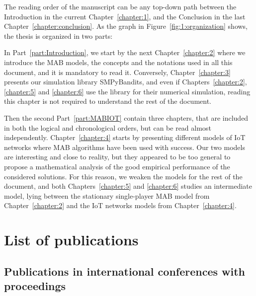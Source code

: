 The reading order of the manuscript can be any top-down path between the Introduction in the current Chapter~\ref{chapter:1}, and the Conclusion in the last Chapter~\ref{chapter:conclusion}. As the graph in Figure~\ref{fig:1:organization} shows,
the thesis is organized in two parts:

In Part~\ref{part:Introduction}, we start by the next Chapter~\ref{chapter:2} where we introduce the MAB models, the concepts and the notations used in all this document, and it is mandatory to read it.
Conversely, Chapter~\ref{chapter:3} presents our simulation library SMPyBandits, and even if Chapters~\ref{chapter:2}, \ref{chapter:5} and \ref{chapter:6} use the library for their numerical simulation, reading this chapter is not required to understand the rest of the document.

Then the second Part~\ref{part:MABIOT} contain three chapters, that are included in both the logical and chronological orders, but can be read almost independently.
Chapter~\ref{chapter:4} starts by presenting different models of IoT networks where MAB algorithms have been used with success. Our two models are interesting and close to reality, but they appeared to be too general to propose a mathematical analysis of the good empirical performance of the considered solutions.
For this reason, we weaken the models for the rest of the document,
and both Chapters~\ref{chapter:5} and \ref{chapter:6} studies an intermediate model, lying between the stationary single-player MAB model from Chapter~\ref{chapter:2} and the IoT networks models from Chapter~\ref{chapter:4}.


\section{List of publications}
\label{sec:1:listPublications}

\subsection{Publications in international conferences with proceedings}

